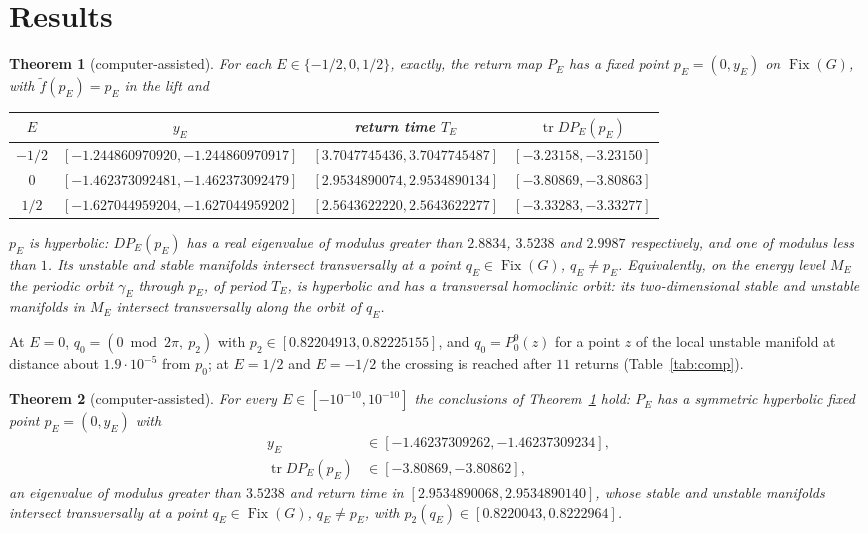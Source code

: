 \documentclass[11pt]{article}
\newtheorem{theorem}{Theorem}
\theoremstyle{definition}
\newcommand{\Fix}{\operatorname{Fix}}
\newcommand{\tf}{\tilde f}
\begin{document}
\section{Results}\label{sec:results}

\begin{theorem}[computer-assisted]\label{thm:main}
For each $E \in \{-1/2, 0, 1/2\}$, exactly, the return map $P_E$ has a fixed point $p_E = (0, y_E)$ on $\Fix(G)$, with $\tf(p_E) = p_E$ in the lift and
\begin{center}\small\setlength{\tabcolsep}{4pt}
\begin{tabular}{@{}cccc@{}}
\toprule
$E$ & $y_E$ & return time $T_E$ & $\operatorname{tr} DP_E(p_E)$ \\
\midrule
$-1/2$ & $[-1.244860970920, -1.244860970917]$ & $[3.7047745436, 3.7047745487]$ & $[-3.23158, -3.23150]$ \\
$0$ & $[-1.462373092481, -1.462373092479]$ & $[2.9534890074, 2.9534890134]$ & $[-3.80869, -3.80863]$ \\
$1/2$ & $[-1.627044959204, -1.627044959202]$ & $[2.5643622220, 2.5643622277]$ & $[-3.33283, -3.33277]$ \\
\bottomrule
\end{tabular}
\end{center}
$p_E$ is hyperbolic: $DP_E(p_E)$ has a real eigenvalue of modulus greater than $2.8834$, $3.5238$ and $2.9987$ respectively, and one of modulus less than $1$. Its unstable and stable manifolds intersect transversally at a point $q_E \in \Fix(G)$, $q_E \ne p_E$. Equivalently, on the energy level $M_E$ the periodic orbit $\gamma_E$ through $p_E$, of period $T_E$, is hyperbolic and has a transversal homoclinic orbit: its two-dimensional stable and unstable manifolds in $M_E$ intersect transversally along the orbit of $q_E$.
\end{theorem}

At $E = 0$, $q_0 = (0 \bmod 2\pi,\ p_2)$ with $p_2 \in [0.82204913, 0.82225155]$, and $q_0 = P_0^9(z)$ for a point $z$ of the local unstable manifold at distance about $1.9 \cdot 10^{-5}$ from $p_0$; at $E = 1/2$ and $E = -1/2$ the crossing is reached after $11$ returns (Table~\ref{tab:comp}).

\begin{theorem}[computer-assisted]\label{thm:interval}
For every $E \in [-10^{-10}, 10^{-10}]$ the conclusions of Theorem~\ref{thm:main} hold: $P_E$ has a symmetric hyperbolic fixed point $p_E = (0, y_E)$ with
\[
\begin{aligned}
y_E &\in [-1.46237309262, -1.46237309234],\\
\operatorname{tr}DP_E(p_E) &\in [-3.80869, -3.80862],
\end{aligned}
\]
an eigenvalue of modulus greater than $3.5238$ and return time in $[2.9534890068, 2.9534890140]$, whose stable and unstable manifolds intersect transversally at a point $q_E \in \Fix(G)$, $q_E \ne p_E$, with $p_2(q_E) \in [0.8220043, 0.8222964]$.
\end{theorem}
\end{document}
